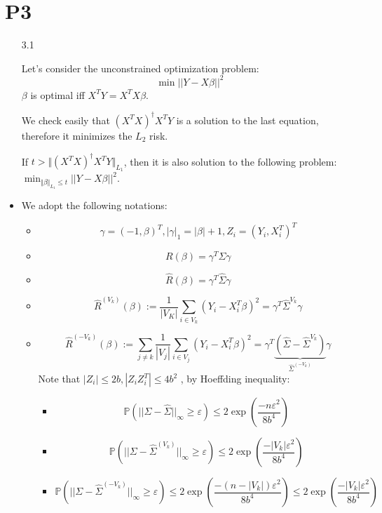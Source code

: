 \documentclass[12pt]{article}
\newcommand{\pr}{{\mathbb P}}
\newcommand{\norm}[1]{\Vert #1 \Vert}
\begin{document}
\section*{P3}
\begin{itemize}
\item[3.1]

  Let's consider the unconstrained optimization problem:
  $$\min ||Y - X \beta||^2$$
  $\beta$ is optimal iff $X^TY = X^TX\beta$.
  
  We check easily that $(X^TX)^{\dagger}X^TY$ is a solution to the last equation, therefore it minimizes the $L_2$ risk.
  
  If $t > \norm{(X^TX)^{\dagger}X^TY}_{L_1}$, then it is also solution to the following problem:   $\min_{\norm{\beta}_{L_1} \le t} ||Y - X \beta||^2$.
  
\item
  We adopt the following  notations:
\begin{itemize}
  
\item $$\gamma = (-1, \beta)^T, |\gamma|_{1} = |\beta| + 1, Z_i = (Y_i, X_i^T)^T$$
  
\item $$R(\beta) = \gamma^T \Sigma \gamma$$
  
\item $$\hat R(\beta) = \gamma^T \hat \Sigma \gamma$$
  
\item $$\hat R^{(V_k)}(\beta) := \frac{1}{|V_K|}\sum_{i \in V_k} (Y_i - X_i^T\beta)^2 = \gamma^T \hat \Sigma^{V_k} \gamma$$
  
\item $$\hat R^{(-V_k)}(\beta) := \sum_{j \ne k} \frac{1}{|V_j|} \sum_{i \in V_j} (Y_i - X_i^T\beta)^2 = \gamma^T \underbrace{(\hat \Sigma - \hat \Sigma^{V_k})}_{\hat \Sigma^{(-V_k)}} \gamma$$
  Note that $|Z_i| \le 2 b, |Z_iZ_i^T| \le 4b^2$ , by Hoeffding inequality:
  \begin{itemize}
  \item $$\pr(||\Sigma - \hat \Sigma||_{\infty} \ge \varepsilon) \le 2 \exp(\frac{-n\varepsilon^2}{8b^4})$$

  \item $$\pr(||\Sigma - \hat \Sigma^{(V_k)}||_{\infty} \ge \varepsilon) \le 2 \exp(\frac{-|V_k|\varepsilon^2}{8b^4})$$
  \item $$\pr(||\Sigma - \hat \Sigma^{(-V_k)}||_{\infty} \ge \varepsilon) \le 2 \exp(\frac{-(n-|V_k|)\varepsilon^2}{8b^4}) \le 2 \exp(\frac{-|V_k|\varepsilon^2}{8b^4})$$
  

\end{itemize}
\end{itemize}
\end{itemize}
\end{document}
